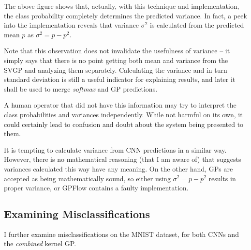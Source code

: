 \documentclass{article}
\begin{document}
The above figure shows that, actually, with this technique and implementation, the class probability completely determines the predicted variance. In fact, a peek into the implementation reveals that variance $\sigma^2$ is calculated from the predicted mean $p$ as $\sigma^2 = p - p^2$.

Note that this observation does not invalidate the usefulness of variance -- it simply says that there is no point getting both mean and variance from the SVGP and analyzing them separately. Calculating the variance and in turn standard deviation is still a useful indicator for explaining results, and later it shall be used to merge \textit{softmax} and GP predictions.

A human operator that did not have this information may try to interpret the class probabilities and variances independently. While not harmful on its own, it could certainly lead to confusion and doubt about the system being presented to them.

It is tempting to calculate variance from CNN predictions in a similar way. However, there is no mathematical reasoning (that I am aware of) that suggests variances calculated this way have any meaning. On the other hand, GPs are accepted as being mathematically sound, so either using $\sigma^2 = p - p^2$ results in proper variance, or GPFlow contains a faulty implementation.


\subsection{Examining Misclassifications}

I further examine misclassifications on the MNIST dataset, for both CNNs and the \textit{combined} kernel GP.

\end{document}
